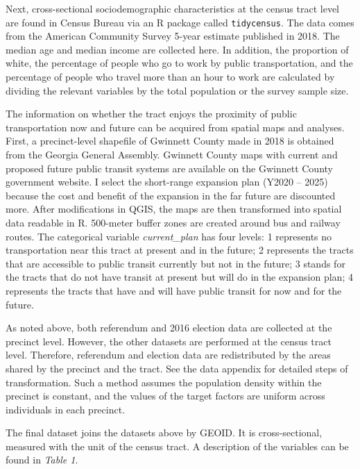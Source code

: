 \documentclass[
]{article}
\begin{document}
Next, cross-sectional sociodemographic characteristics at the census
tract level are found in Census Bureau via an R package called
\texttt{tidycensus}. The data comes from the American Community Survey
5-year estimate published in 2018. The median age and median income are
collected here. In addition, the proportion of white, the percentage of
people who go to work by public transportation, and the percentage of
people who travel more than an hour to work are calculated by dividing
the relevant variables by the total population or the survey sample
size.

The information on whether the tract enjoys the proximity of public
transportation now and future can be acquired from spatial maps and
analyses. First, a precinct-level shapefile of Gwinnett County made in
2018 is obtained from the Georgia General Assembly. Gwinnett County maps
with current and proposed future public transit systems are available on
the Gwinnett County government website. I select the short-range
expansion plan (Y2020 -- 2025) because the cost and benefit of the
expansion in the far future are discounted more. After modifications in
QGIS, the maps are then transformed into spatial data readable in R.
500-meter buffer zones are created around bus and railway routes. The
categorical variable \emph{current\_plan} has four levels: 1 represents
no transportation near this tract at present and in the future; 2
represents the tracts that are accessible to public transit currently
but not in the future; 3 stands for the tracts that do not have transit
at present but will do in the expansion plan; 4 represents the tracts
that have and will have public transit for now and for the future.

As noted above, both referendum and 2016 election data are collected at
the precinct level. However, the other datasets are performed at the
census tract level. Therefore, referendum and election data are
redistributed by the areas shared by the precinct and the tract. See the
data appendix for detailed steps of transformation. Such a method
assumes the population density within the precinct is constant, and the
values of the target factors are uniform across individuals in each
precinct.

The final dataset joins the datasets above by GEOID. It is
cross-sectional, measured with the unit of the census tract. A
description of the variables can be found in \emph{Table 1}.
\end{document}
